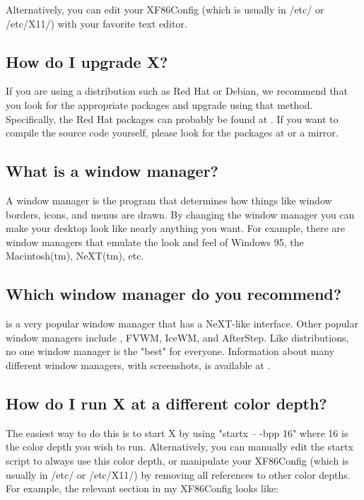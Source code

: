\documentclass[a4paper]{article}
\begin{document}
Alternatively, you can edit your XF86Config (which is usually in /etc/
or /etc/X11/) with your favorite text editor.




\subsection{How do I upgrade X?}

If you are using a distribution such as Red Hat or Debian, we recommend
that you look for the appropriate packages and upgrade using that
method.  Specifically, the Red Hat packages can probably be found at
.  If you want to compile the source
code yourself, please look for the packages at  or a mirror.




\subsection{What is a window manager?}

A window manager is the program that determines how things like window
borders, icons, and menus are drawn.  By changing the window manager you 
can make your desktop look like nearly anything you want.  For example,
there are window managers that emulate the look and feel of Windows 95,
the Macintosh(tm), NeXT(tm), etc.




\subsection{Which window manager do you recommend?}

 is a very 
popular window manager that has a NeXT-like interface.  Other
popular window managers include , FVWM, IceWM, and AfterStep.  Like distributions,
no one window manager is the "best" for everyone.  Information about
many different window managers, with screenshots, is available at
.




\subsection{How do I run X at a different color depth?}

The easiest way to do this is to start X by using "startx -- -bpp 16"
where 16 is the color depth you wish to run.  Alternatively, you can
manually edit the startx script to always use this color depth, or
manipulate your XF86Config (which is usually in /etc/ or /etc/X11/) by
removing all references to other color depths.  For example, the
relevant section in my XF86Config looks like:
\end{document}
